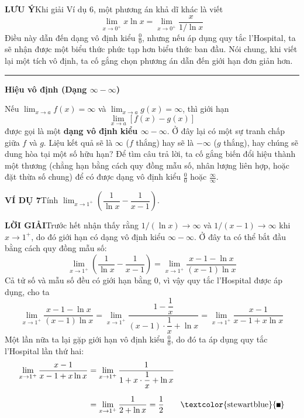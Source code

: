 \noindent\textcolor{stewartgreen}{\textsf{\textbf{LƯU Ý}}}\quad Khi giải Ví dụ 6, một phương án khả dĩ khác là viết
\[
\lim_{x \to 0^+} x \ln x = \lim_{x \to 0^+} \frac{x}{1/\ln x}
\]
Điều này dẫn đến dạng vô định kiểu $\frac{0}{0}$, nhưng nếu áp dụng quy tắc l'Hospital, ta sẽ nhận được một biểu thức phức tạp hơn biểu thức ban đầu. Nói chung, khi viết lại một tích vô định, ta cố gắng chọn phương án dẫn đến giới hạn đơn giản hơn.

\vspace{1.2em}
\noindent\textcolor{stewartblue}{\rule{1.1ex}{1.1ex}}\hspace{0.5em}\textbf{Hiệu vô định (Dạng $\boldsymbol{\infty - \infty}$)}

\vspace{0.2em}
Nếu $\lim_{x \to a} f(x) = \infty$ và $\lim_{x \to a} g(x) = \infty$, thì giới hạn
\[
\lim_{x \to a} [f(x) - g(x)]
\]
được gọi là một \textbf{dạng vô định kiểu $\boldsymbol{\infty - \infty}$}. Ở đây lại có một sự tranh chấp giữa $f$ và $g$. Liệu kết quả sẽ là $\infty$ ($f$ thắng) hay sẽ là $-\infty$ ($g$ thắng), hay chúng sẽ dung hòa tại một số hữu hạn? Để tìm câu trả lời, ta cố gắng biến đổi hiệu thành một thương (chẳng hạn bằng cách quy đồng mẫu số, nhân lượng liên hợp, hoặc đặt thừa số chung) để có được dạng vô định kiểu $\frac{0}{0}$ hoặc $\frac{\infty}{\infty}$.

\vspace{1.3em}
\noindent\textcolor{stewartblue}{\textbf{VÍ DỤ 7}}\quad Tính $\lim_{x \to 1^+} \left( \dfrac{1}{\ln x} - \dfrac{1}{x - 1} \right)$.

\vspace{0.3em}
\noindent\textcolor{stewartblue}{\textbf{LỜI GIẢI}}\quad Trước hết nhận thấy rằng $1/(\ln x) \to \infty$ và $1/(x - 1) \to \infty$ khi $x \to 1^+$, do đó giới hạn có dạng vô định kiểu $\infty - \infty$. Ở đây ta có thể bắt đầu bằng cách quy đồng mẫu số:
\[
\lim_{x \to 1^+} \left( \frac{1}{\ln x} - \frac{1}{x - 1} \right) = \lim_{x \to 1^+} \frac{x - 1 - \ln x}{(x - 1)\ln x}
\]
Cả tử số và mẫu số đều có giới hạn bằng $0$, vì vậy quy tắc l'Hospital được áp dụng, cho ta
\[
\lim_{x \to 1^+} \frac{x - 1 - \ln x}{(x - 1)\ln x} = \lim_{x \to 1^+} \frac{1 - \dfrac{1}{x}}{(x - 1)\cdot \dfrac{1}{x} + \ln x} = \lim_{x \to 1^+} \frac{x - 1}{x - 1 + x\ln x}
\]
Một lần nữa ta lại gặp giới hạn vô định kiểu $\frac{0}{0}$, do đó ta áp dụng quy tắc l'Hospital lần thứ hai:
\begin{align*}
\lim_{x \to 1^+} \frac{x - 1}{x - 1 + x\ln x} &= \lim_{x \to 1^+} \frac{1}{1 + x \cdot \dfrac{1}{x} + \ln x} \\[6pt]
&= \lim_{x \to 1^+} \frac{1}{2 + \ln x} = \frac{1}{2} \tag*{\textcolor{stewartblue}{\rule{1.1ex}{1.1ex}}}
\end{align*}

